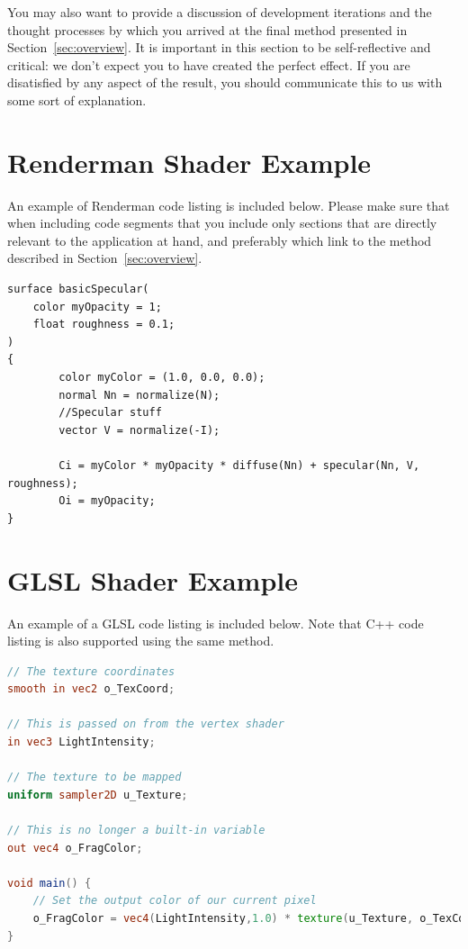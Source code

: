 \documentclass[]{acmsiggraph}
\begin{document}
You may also want to provide a discussion of development iterations and the thought processes by which you arrived at the final method presented in Section~\ref{sec:overview}. It is important in this section to be self-reflective and critical: we don't expect you to have created the perfect effect. If you are disatisfied by any aspect of the result, you should communicate this to us with some sort of explanation.




\newpage
\appendix
\section{Renderman Shader Example}\label{app:renderman}
An example of Renderman code listing is included below. Please make sure that when including code segments that you include only sections that are directly relevant to the application at hand, and preferably which link to the method described in Section~\ref{sec:overview}.
\begin{lstlisting}[language=rendermansl, label={lst:renderman}, caption={Renderman example lifted from \protect\cite{renderman16}.}]
surface basicSpecular(
    color myOpacity = 1; 
    float roughness = 0.1;
)
{
        color myColor = (1.0, 0.0, 0.0);
        normal Nn = normalize(N);
        //Specular stuff
        vector V = normalize(-I);
        
        Ci = myColor * myOpacity * diffuse(Nn) + specular(Nn, V, roughness);
        Oi = myOpacity;
} 
\end{lstlisting}


\section{GLSL Shader Example}\label{app:glsl}
An example of a GLSL code listing is included below. Note that C++ code listing is also supported using the same method.

\begin{lstlisting}[language=GLSL, label={lst:glsl}, caption={A simple textured shader.}]
// The texture coordinates
smooth in vec2 o_TexCoord;

// This is passed on from the vertex shader
in vec3 LightIntensity;

// The texture to be mapped
uniform sampler2D u_Texture;

// This is no longer a built-in variable
out vec4 o_FragColor;

void main() {
    // Set the output color of our current pixel
    o_FragColor = vec4(LightIntensity,1.0) * texture(u_Texture, o_TexCoord);
}
\end{lstlisting}
\end{document}
